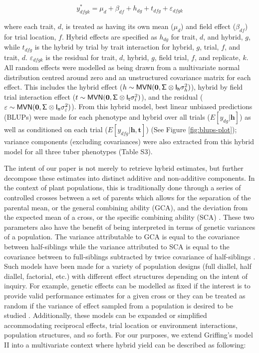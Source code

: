 \begin{equation}
y_{dfgk}^* = \mu_d + \beta_{df} + h_{dg} + t_{dfg} + \varepsilon_{dfgk}
\label{eq:hybrid}
\end{equation}

where each trait, \(d\), is treated as having its own mean (\(\mu_d\)) and field effect (\(\beta_{df}\)) for trial location, \(f\). Hybrid effects are specified as \(h_{dg}\) for trait, \(d\), and hybrid, \(g\), while \(t_{dfg}\) is the hybrid by trial by trait interaction for hybrid, \(g\), trial, \(f\), and trait, \(d\). \(\varepsilon_{dfgk}\) is the residual for trait, \(d\), hybrid, \(g\), field trial, \(f\), and replicate, \(k\). All random effects were modelled as being drawn from a multivariate normal distribution centred around zero and an unstructured covariance matrix for each effect. This includes the hybrid effect (\(h\sim \mathsf{MVN}({\bf 0},\mathsf{\Sigma\otimes I_h} \sigma_h^2)\)), hybrid by field trial interaction effect (\(t\sim \mathsf{MVN}({\bf 0},\mathsf{\Sigma\otimes I_t}\sigma_t^2)\)), and the residual (\(\varepsilon \sim \mathsf{MVN}({\bf 0},\mathsf{\Sigma\otimes I_n}\sigma_\varepsilon^2)\)). From this hybrid model, best linear unbiased predictions (BLUPs) were made for each phenotype and hybrid over all trials (\(E[y_{dg}|\mathbf{h}]\)) as well as conditioned on each trial (\(E[y_{dfg}|\mathbf{h},\mathbf{t}]\)) (See Figure \ref{fig:blups-plot}); variance components (excluding covariances) were also extracted from this hybrid model for all three tuber phenotypes (Table S3).

The intent of our paper is not merely to retrieve hybrid estimates, but further decompose these estimates into distinct additive and non-additive components. In the context of plant populations, this is traditionally done through a series of controlled crosses between a set of parents which allows for the separation of the parental mean, or the general combining ability (GCA), and the deviation from the expected mean of a cross, or the specific combining ability (SCA) \citep{Sprague1942}. These two parameters also have the benefit of being interpreted in terms of genetic variances of a population. The variance attributable to GCA is equal to the covariance between half-siblings while the variance attributed to SCA is equal to the covariance between to full-siblings subtracted by twice covariance of half-siblings \citep{Bernardo2002}. Such models have been made for a variety of population designs (full diallel, half diallel, factorial, etc.) with different effect structures depending on the intent of inquiry. For example, genetic effects can be modelled as fixed if the interest is to provide valid performance estimates for a given cross or they can be treated as random if the variance of effect sampled from a population is desired to be studied \citep{Eisenhart1947}. Additionally, these models can be expanded or simplified accommodating reciprocal effects, trial location or environment interactions, population structures, and so forth. For our purposes, we extend Griffing's model II \citep{Griffing1956} into a multivariate context where hybrid yield can be described as following:

